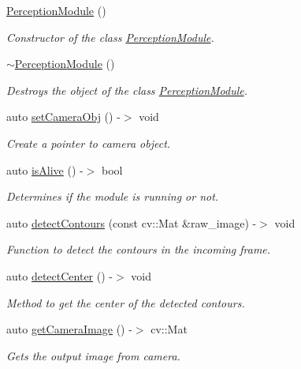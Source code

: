 \begin{DoxyCompactItemize}
\item 
\hyperlink{class_perception_module_a62e6934da7b7ab114c02a34e8030e0ec}{Perception\+Module} ()
\begin{DoxyCompactList}\small\item\em Constructor of the class \hyperlink{class_perception_module}{Perception\+Module}. \end{DoxyCompactList}\item 
\hyperlink{class_perception_module_a52bf1fd6688cd15a6687bc8af69bf116}{$\sim$\+Perception\+Module} ()
\begin{DoxyCompactList}\small\item\em Destroys the object of the class \hyperlink{class_perception_module}{Perception\+Module}. \end{DoxyCompactList}\item 
auto \hyperlink{class_perception_module_a60ab0780b4400096b029698b6c8f0dc7}{set\+Camera\+Obj} () -\/$>$ void
\begin{DoxyCompactList}\small\item\em Create a pointer to camera object. \end{DoxyCompactList}\item 
auto \hyperlink{class_perception_module_a934854719b0e95576883b7cb5098a7a5}{is\+Alive} () -\/$>$ bool
\begin{DoxyCompactList}\small\item\em Determines if the module is running or not. \end{DoxyCompactList}\item 
auto \hyperlink{class_perception_module_a851a7c7b5e9e11459dd171bb31128402}{detect\+Contours} (const cv\+::\+Mat \&raw\+\_\+image) -\/$>$ void
\begin{DoxyCompactList}\small\item\em Function to detect the contours in the incoming frame. \end{DoxyCompactList}\item 
auto \hyperlink{class_perception_module_ad3c7a85f300e3a545da8a619af99d4de}{detect\+Center} () -\/$>$ void
\begin{DoxyCompactList}\small\item\em Method to get the center of the detected contours. \end{DoxyCompactList}\item 
auto \hyperlink{class_perception_module_a11b2a35583209674467527ddafca2d6e}{get\+Camera\+Image} () -\/$>$ cv\+::\+Mat
\begin{DoxyCompactList}\small\item\em Gets the output image from camera. \end{DoxyCompactList}\item 

\end{DoxyCompactItemize}
